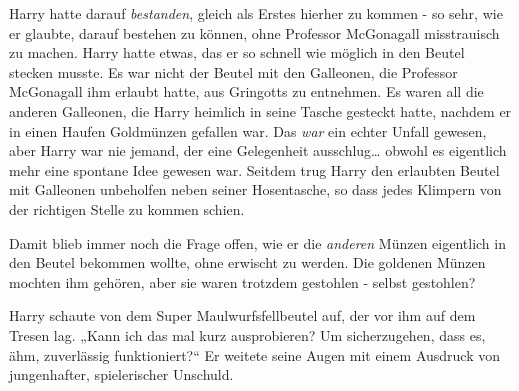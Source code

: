 Harry hatte darauf \emph{bestanden}, gleich als Erstes hierher zu kommen - so sehr, wie er glaubte, darauf bestehen zu können, ohne Professor McGonagall misstrauisch zu machen. Harry hatte etwas, das er so schnell wie möglich in den Beutel stecken musste. Es war nicht der Beutel mit den Galleonen, die Professor McGonagall ihm erlaubt hatte, aus Gringotts zu entnehmen. Es waren all die anderen Galleonen, die Harry heimlich in seine Tasche gesteckt hatte, nachdem er in einen Haufen Goldmünzen gefallen war. Das \emph{war} ein echter Unfall gewesen, aber Harry war nie jemand, der eine Gelegenheit ausschlug… obwohl es eigentlich mehr eine spontane Idee gewesen war. Seitdem trug Harry den erlaubten Beutel mit Galleonen unbeholfen neben seiner Hosentasche, so dass jedes Klimpern von der richtigen Stelle zu kommen schien.

Damit blieb immer noch die Frage offen, wie er die \emph{anderen} Münzen eigentlich in den Beutel bekommen wollte, ohne erwischt zu werden. Die goldenen Münzen mochten ihm gehören, aber sie waren trotzdem gestohlen - selbst gestohlen?

Harry schaute von dem Super Maulwurfsfellbeutel  auf, der vor ihm auf dem Tresen lag. „Kann ich das mal kurz ausprobieren? Um sicherzugehen, dass es, ähm, zuverlässig funktioniert?“ Er weitete seine Augen mit einem Ausdruck von jungenhafter, spielerischer Unschuld.

